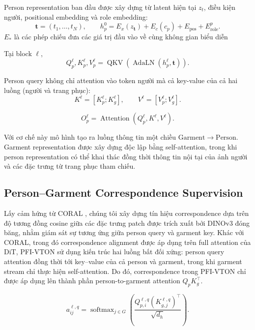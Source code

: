 \documentclass[11pt,a4paper]{article}
\begin{document}
Person representation ban đầu được xây dựng từ latent hiện tại \(z_t\), điều kiện người, positional embedding và role embedding:
\begin{equation}
\mathbf t=(t_1,\ldots,t_N),\qquad h_p^0=E_x(z_{\mathbf t})+E_c(c_p)+E_{\mathrm{pos}}+E_{\mathrm{role}}^{p}.
\end{equation}
\(E_*\) là các phép chiếu đưa các giá trị đầu vào về cùng không gian biểu diễn

Tại block \(\ell\),
\begin{equation}
Q_p^\ell,K_p^\ell,V_p^\ell=\operatorname{QKV}\left(\operatorname{AdaLN}(h_p^\ell,\mathbf t)\right).
\end{equation}

Person query không chỉ attention vào token người mà cả key-value của cả hai luồng (người và trang phục):
\begin{equation}
K^\ell=[K_p^\ell;K_g^\ell],\qquad V^\ell=[V_p^\ell;V_g^\ell].
\end{equation}

\begin{equation}
O_p^\ell=\operatorname{Attention}(Q_p^\ell,K^\ell,V^\ell).
\end{equation}

Với cơ chế này mô hình tạo ra luồng thông tin một chiều $\mathrm{Garment}\rightarrow\mathrm{Person}$. Garment representation được xây dựng độc lập bằng self-attention, trong khi person representation có thể khai thác đồng thời thông tin nội tại của ảnh người và các đặc trưng từ trang phục tham chiếu.

\subsection{Person--Garment Correspondence Supervision}

Lấy cảm hứng từ CORAL \cite{coral}, chúng tôi xây dựng tín hiệu correspondence dựa trên độ tương đồng cosine giữa các đặc trưng patch được trích xuất bởi DINOv3 \cite{dinov3} đóng băng, nhằm giám sát sự tương ứng giữa person query và garment key. Khác với CORAL, trong đó correspondence alignment được áp dụng trên full attention của DiT, PFI-VTON sử dụng kiến trúc hai luồng bất đối xứng: person query attention đồng thời tới key--value của cả person và garment, trong khi garment stream chỉ thực hiện self-attention. Do đó, correspondence trong PFI-VTON chỉ được áp dụng lên thành phần person-to-garment attention \(Q_pK_g^\top\).


\begin{equation}
a_{ij}^{\ell,q}=\operatorname{softmax}_{j\in G}\left(\frac{Q_{p,i}^{\ell,q}(K_{g,j}^{\ell,q})^\top}{\sqrt{d_h}}\right).
\end{equation}
\end{document}
